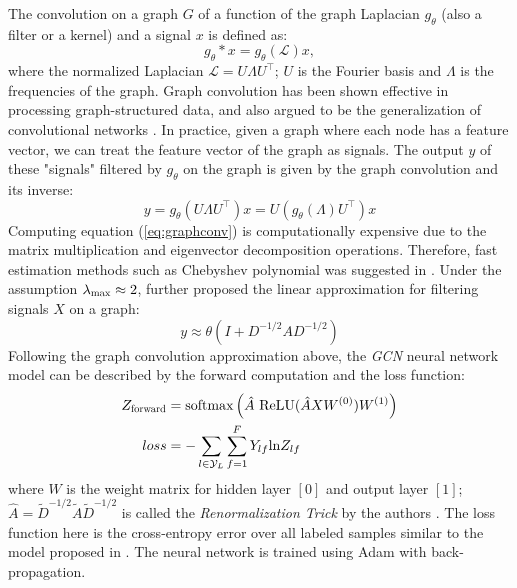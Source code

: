 \documentclass{article}
\theoremstyle{definition}
\begin{document}
The convolution on a graph $G$ of a function of the graph
Laplacian $g_{\theta}$ (also a filter or a kernel)
and a signal $x$ is defined as:
$$g_{\theta} \ast x = g_{\theta}(\mathcal{L}) x,$$
where the normalized Laplacian $\mathcal{L} = U \Lambda U^\top$;
$U$ is the Fourier basis and $\Lambda$ is the frequencies of the graph.
Graph convolution has been shown effective in processing
graph-structured data, and also argued to be the generalization
of convolutional networks
\cite{shuman2013emerging,defferrard2016convolutional,gcn}.
In practice, given a graph where each node has a feature vector,
we can treat the feature vector of the graph as signals. The output $y$
of these "signals" filtered by $g_\theta$ on the graph is given by
the graph convolution and its inverse:
\begin{equation}
\label{eq:graphconv}
y = g_\theta (U \Lambda U^\top) x = U (g_\theta(\Lambda) U^\top)x
\end{equation}
Computing equation (\ref{eq:graphconv}) is computationally expensive
due to the matrix multiplication and eigenvector decomposition operations.
Therefore, fast estimation methods such as Chebyshev polynomial was suggested
in \cite{hammond2011wavelets}. Under the assumption
$\lambda_{\scalebox{0.75}{max}} \approx 2$, \citeauthor{gcn} further
proposed the linear approximation for filtering signals $X$ on a graph:
\begin{equation}
\label{eq:gcnapprox}
y \approx \theta \left( I + D^{-1/2}
A D^{-1/2} \right)
\end{equation}
Following the graph convolution approximation above, the \emph{GCN} neural network
model can be described by the forward computation and the loss function:
\begin{equation}
\label{eq:gcnnn}
\begin{aligned}
	Z_{\scalebox{0.75}{forward}} &=
\mbox{softmax}\left(\hat{A} \mbox{ ReLU}(\hat{A}XW^{(0)})W^{(1)}\right) \\
	loss &= -\sum_{l \in \mathcal{Y}_L} \sum^F_{f=1} Y_{lf}\mbox{ln} Z_{lf} \\
\end{aligned}
\end{equation}
where $W$ is the weight matrix for hidden layer $[0]$ and output layer $[1]$;
$\hat{A} = \tilde{D}^{-1/2} \tilde{A} \tilde{D}^{-1/2}$ is called the
\emph{Renormalization Trick} by the authors \cite{gcn}. The loss function here
is the cross-entropy error over all labeled samples similar to the model proposed
in \cite{planetoid}. The neural network is trained using Adam \cite{adam} with
back-propagation.
\end{document}
